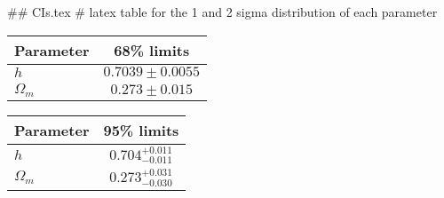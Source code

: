 ## CIs.tex
# latex table for the 1 and 2 sigma distribution of each parameter

\begin{tabular} { l  c}
 Parameter &  68\% limits\\
\hline
{\boldmath$h              $} & $0.7039\pm 0.0055          $\\
{\boldmath$\Omega_m       $} & $0.273\pm 0.015            $\\
\hline
\end{tabular}

\begin{tabular} { l  c}
 Parameter &  95\% limits\\
\hline
{\boldmath$h              $} & $0.704^{+0.011}_{-0.011}   $\\
{\boldmath$\Omega_m       $} & $0.273^{+0.031}_{-0.030}   $\\
\hline
\end{tabular}
